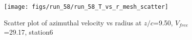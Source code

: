 \begin{figure}[H]
\centering
\texttt{[image: figs/run\_58/run\_58\_T\_vs\_r\_mesh\_scatter]}
\caption{Scatter plot of azimuthal velocity vs radius at $z/c$=9.50, $V_{free}$=29.17, station6}
\label{fig:run_58_T_vs_r_mesh_scatter}
\end{figure}


